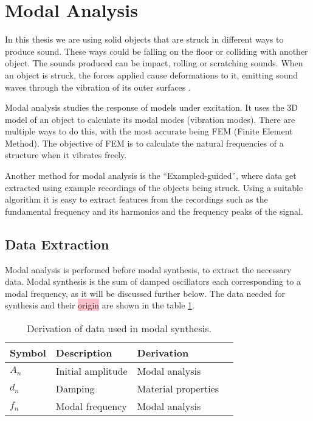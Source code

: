 \section{Modal Analysis}\label{sec:modal_analysis}
In this thesis we are using solid objects that are struck in different ways to produce sound. These ways could be falling on the floor or colliding with another object. The sounds produced can be impact, rolling or scratching sounds. When an object is struck, the forces applied cause deformations to it, emitting sound waves through the vibration of its outer surfaces \cite{van2001foleyautomatic}.

Modal analysis studies the response of models under excitation. It uses the 3D model of an object to calculate its modal modes (vibration modes). There are multiple ways to do this, with the most accurate being FEM (Finite Element Method). The objective of FEM is to calculate the natural frequencies of a structure when it vibrates freely.

Another method for modal analysis is the ``Exampled-guided'', where data get extracted using example recordings of the objects being struck. Using a suitable algorithm it is easy to extract features from the recordings such as the fundamental frequency and its harmonics and the frequency peaks of the signal.

\subsection{Data Extraction}\label{sec:data_extract}
Modal analysis is performed before modal synthesis, to extract the necessary data. Modal synthesis is the sum of damped oscillators each corresponding to a modal frequency, as it will be discussed further below. The data needed for synthesis and their \colorbox{pink}{origin} are shown in the table \ref{tab:extracted_data}.

\begin{table}[H]
	\centering
    \begin{tabular}{ | l | l | l | p{5cm} |}
    \hline
    \textbf{Symbol} & \textbf{Description} & \textbf{Derivation} \\ \hline
    $A_n$ & Initial amplitude & Modal analysis \\ \hline
    $d_n$ & Damping & Material properties \\ \hline
    $f_n$ & Modal frequency & Modal analysis \\
    \hline
    \end{tabular}
    \caption{Derivation of data used in modal synthesis.}
    \label{tab:extracted_data}
\end{table} 


